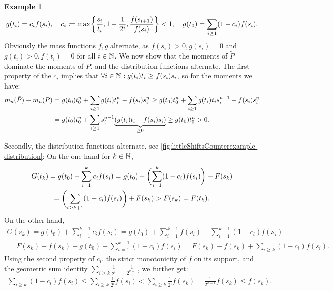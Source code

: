 \documentclass[a4paper,DIV=11,abstracton,twoside=semi]{scrreprt}
\theoremstyle{definition}
\newtheorem{ex}[thm]{Example} %
\begin{document}
\begin{ex}
        \begin{gather*}
            g(t_i) = c_i f(s_i), \quad
            c_i \coloneqq \max\biggset{\frac{s_i}{t_i}, 1-\frac{1}{2^i}, \frac{f(s_{i+1})}{f(s_i)}} < 1, \quad
            g(t_0) = \sum_{i \geq 1} (1-c_i) f(s_i).
        \end{gather*}
        Obviously the mass functions $f, g$ alternate, as $f(s_i) > 0, g(s_i) = 0$ and $g(t_i) > 0, f(t_i) = 0$ for all $i \in \N$. We now show that the moments of $\tilde{P}$ dominate the moments of $P$, and the distribution functions alternate.
        The first property of the $c_i$ implies that $\forall i \in \N: g(t_i)t_i  \geq  f(s_i)s_i$, so for the moments we have:
        \begin{multline*}
            m_n(\tilde{P}) - m_n(P)
            = g(t_0)t_0^n + \sum_{i \geq 1} g(t_i) t_i^n - f(s_i) s_i^n
            \geq g(t_0)t_0^n + \sum_{i \geq 1} g(t_i) t_i s_i^{n-1} - f(s_i) s_i^n  \\
            = g(t_0)t_0^n + \sum_{i \geq 1} s_i^{n-1} \undersetbrace{(g(t_i)t_i - f(s_i)s_i)}{\geq 0}
            \geq g(t_0)t_0^n > 0.
        \end{multline*}
        
        Secondly, the distribution functions alternate, see \autoref{fig:littleShiftsCounterexample-distribution}: On the one hand for $k \in \N$, 
        \begin{multline*}
            G(t_k) 
            = g(t_0) + \sum_{i=1}^k c_i f(s_i) 
            = g(t_0) - \biggpars{\sum_{i=1}^k (1-c_i)f(s_i)} + F(s_k) \\
            = \biggpars{\sum_{i \geq k+1} (1-c_i)f(s_i)} + F(s_k) > F(s_k) = F(t_k).
        \end{multline*}
        On the other hand, 
        \begin{multline*}
            G(s_k)
            = g(t_0) + \sum_{i=1}^{k-1} c_i f(s_i) 
            = g(t_0) + \sum_{i=1}^{k-1} f(s_i) - \sum_{i=1}^{k-1} (1-c_i) f(s_i) \\
            = F(s_k) - f(s_k) + g(t_0) - \sum_{i=1}^{k-1} (1-c_i) f(s_i)  
            = F(s_k) - f(s_k) + \sum_{i \geq k} (1-c_i) f(s_i).
        \end{multline*}
        Using the second property of $c_i$, the strict monotonicity of $f$ on its support, and the geometric sum identity $\sum_{i \geq k} \frac{1}{2^i} = 
        \frac{1}{2^{k-1}}$, we further get:
        \begin{gather*}
            \sum_{i \geq k} (1-c_i)f(s_i) \leq \sum_{i \geq k} \frac{1}{2^i} f(s_i) < \sum_{i \geq k} \frac{1}{2^i} f(s_k) = \frac{1}{2^{k-1}} f(s_k) \leq f(s_k).
        \end{gather*}
        

\end{ex}
\end{document}
